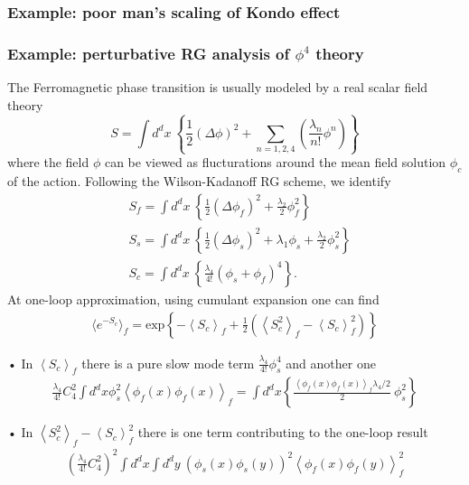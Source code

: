 \documentclass[submission, PhysLectNotes]{SciPost}
\newcommand{\ExOp}[1]{\left\langle#1\right\rangle}
\begin{document}
\subsubsection{Example: poor man's scaling of Kondo effect}
\subsubsection{Example: perturbative RG analysis of $\phi^4$ theory}
The Ferromagnetic phase transition is usually modeled by a real scalar field theory
\begin{equation}
S = \int d^dx \ \left\{\frac{1}{2}\left(\Delta\phi\right)^2 + \sum_{n=1,2,4}\left(\frac{\lambda_n}{n!}\phi^n\right) \right\}
\end{equation}
where the field $\phi$ can be viewed as flucturations around the mean field solution $\phi_c$ of the action. Following the Wilson-Kadanoff RG scheme, we identify
\begin{equation}
\begin{aligned}
&S_f = \int d^dx \ \left\{\frac{1}{2}\left(\Delta\phi_f\right)^2 + \frac{\lambda_2}{2}\phi_f^2 \right\} \\
&S_s = \int d^dx \ \left\{\frac{1}{2}\left(\Delta\phi_s\right)^2 + \lambda_1 \phi_s + \frac{\lambda_2}{2}\phi_s^2 \right\} \\
&S_c = \int d^dx \ \left\{ \frac{\lambda_4}{4!}\left(\phi_s + \phi_f\right)^4 \right\}.
\end{aligned}
\end{equation}
At one-loop approximation, using cumulant expansion one can find
\begin{equation}
\begin{aligned}
\langle e^{-S_c} \rangle_f = \mathrm{exp}\left\{{-\ExOp{S_c}_f + \frac{1}{2}\left( \ExOp{S_c^2}_f - \ExOp{S_c}_f^2\right)}\right\}
\end{aligned}
\end{equation}%

• In $\ExOp{S_c}_f$ there is a pure slow mode term $\frac{\lambda_4}{4!}\phi_s^4$ and another one
\begin{equation}
\begin{aligned}
\frac{\lambda_4}{4!} C^2_4 \int d^dx  \phi_s^2 \ExOp{\phi_f(x)\phi_f(x)}_f = \int d^dx \left\{ \frac{\ExOp{\phi_f(x)\phi_f(x)}_f\lambda_4/2}{2}\ \phi_s^2\right\}
\end{aligned}
\end{equation}

• In $\ExOp{S_c^2}_f - \ExOp{S_c}_f^2$ there is one term contributing to the one-loop result
\begin{equation}
\begin{aligned}
\left( \frac{\lambda_4}{4!} C^2_4 \right)^2 \int d^dx \int d^dy \ \left(\phi_s(x)\phi_s(y)\right)^2 \ExOp{\phi_f(x) \phi_f(y)}_f^2
\end{aligned}
\end{equation}
 
\end{document}
